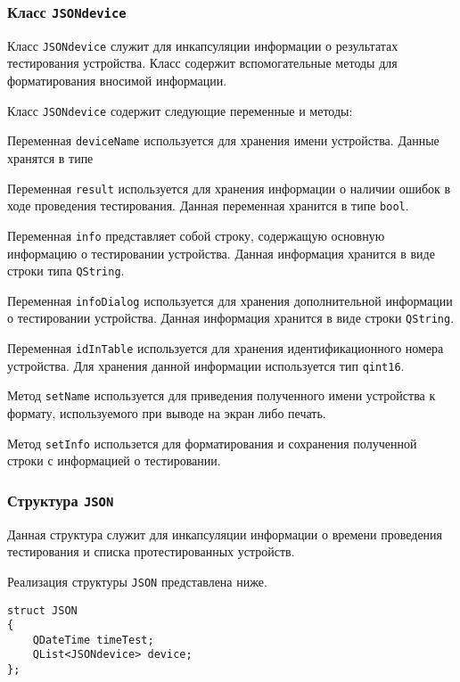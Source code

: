 \subsubsection{Класс \texttt{JSONdevice}}
Класс \texttt{JSONdevice} служит для инкапсуляции информации о результатах тестирования устройства. Класс содержит
вспомогательные методы для форматирования вносимой информации.

Класс \texttt{JSONdevice} содержит следующие переменные и методы:
\begin{enum}
	\item Переменная \texttt{deviceName} используется для хранения имени устройства. Данные хранятся в типе
	\item Переменная \texttt{result} используется для хранения информации о наличии ошибок в ходе проведения тестирования.
		Данная переменная хранится в типе \texttt{bool}.
	\item Переменная \texttt{info} представляет собой строку, содержащую основную информацию о тестировании устройства.
		Данная информация хранится в виде строки типа \texttt{QString}.
	\item Переменная \texttt{infoDialog} используется для хранения дополнительной информации о тестировании устройства.
		Данная информация хранится в виде строки \texttt{QString}.
	\item Переменная \texttt{idInTable} используется для хранения идентификационного номера устройства. Для хранения данной
		информации используется тип \texttt{qint16}.
	\item Метод \texttt{setName} используется для приведения полученного имени устройства к формату, используемого
		при выводе на экран либо печать.
	\item Метод \texttt{setInfo} использется для форматирования и сохранения полученной строки с информацией о
		тестировании.
\end{enum}

\subsubsection{Структура \texttt{JSON}}
Данная структура служит для инкапсуляции информации о времени проведения тестирования и списка протестированных
устройств.

Реализация структуры \texttt{JSON} представлена ниже.
\medskip
\begin{verbatim}
struct JSON
{
	QDateTime timeTest;
	QList<JSONdevice> device;
};
\end{verbatim}
\medskip

